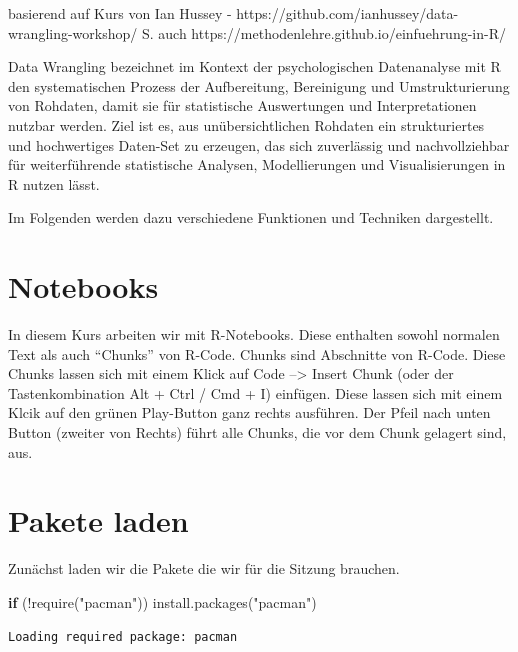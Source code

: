 \documentclass[
  letterpaper,
  DIV=11,
  numbers=noendperiod]{scrreprt}
\newenvironment{Shaded}{\begin{snugshade}}{\end{snugshade}}
\newcommand{\ControlFlowTok}[1]{\textcolor[rgb]{0.00,0.23,0.31}{\textbf{#1}}}
\newcommand{\FunctionTok}[1]{\textcolor[rgb]{0.28,0.35,0.67}{#1}}
\newcommand{\NormalTok}[1]{\textcolor[rgb]{0.00,0.23,0.31}{#1}}
\newcommand{\SpecialCharTok}[1]{\textcolor[rgb]{0.37,0.37,0.37}{#1}}
\newcommand{\StringTok}[1]{\textcolor[rgb]{0.13,0.47,0.30}{#1}}
\begin{document}
basierend auf Kurs von Ian Hussey -
https://github.com/ianhussey/data-wrangling-workshop/ S. auch
https://methodenlehre.github.io/einfuehrung-in-R/

Data Wrangling bezeichnet im Kontext der psychologischen Datenanalyse
mit R den systematischen Prozess der Aufbereitung, Bereinigung und
Umstrukturierung von Rohdaten, damit sie für statistische Auswertungen
und Interpretationen nutzbar werden. Ziel ist es, aus unübersichtlichen
Rohdaten ein strukturiertes und hochwertiges Daten-Set zu erzeugen, das
sich zuverlässig und nachvollziehbar für weiterführende statistische
Analysen, Modellierungen und Visualisierungen in R nutzen lässt.

Im Folgenden werden dazu verschiedene Funktionen und Techniken
dargestellt.


\chapter{Notebooks}\label{notebooks}

In diesem Kurs arbeiten wir mit R-Notebooks. Diese enthalten sowohl
normalen Text als auch ``Chunks'' von R-Code. Chunks sind Abschnitte von
R-Code. Diese Chunks lassen sich mit einem Klick auf Code
--\textgreater{} Insert Chunk (oder der Tastenkombination Alt + Ctrl /
Cmd + I) einfügen. Diese lassen sich mit einem Klcik auf den grünen
Play-Button ganz rechts ausführen. Der Pfeil nach unten Button (zweiter
von Rechts) führt alle Chunks, die vor dem Chunk gelagert sind, aus.


\chapter{Pakete laden}\label{pakete-laden-1}

Zunächst laden wir die Pakete die wir für die Sitzung brauchen.

\begin{Shaded}
\begin{Highlighting}[]
\ControlFlowTok{if}\NormalTok{ (}\SpecialCharTok{!}\FunctionTok{require}\NormalTok{(}\StringTok{"pacman"}\NormalTok{)) }\FunctionTok{install.packages}\NormalTok{(}\StringTok{"pacman"}\NormalTok{)}
\end{Highlighting}
\end{Shaded}

\begin{verbatim}
Loading required package: pacman
\end{verbatim}
\end{document}
